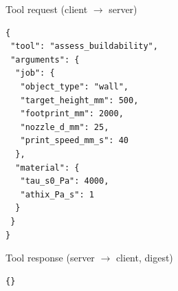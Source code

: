 \begin{mcpbox}{Tool request (client $\rightarrow$ server)}
\begin{lstlisting}[style=jsonstyle]
{
 "tool": "assess_buildability",
 "arguments": {
  "job": {
   "object_type": "wall",
   "target_height_mm": 500,
   "footprint_mm": 2000,
   "nozzle_d_mm": 25,
   "print_speed_mm_s": 40
  },
  "material": {
   "tau_s0_Pa": 4000,
   "athix_Pa_s": 1
  }
 }
}
\end{lstlisting}
\end{mcpbox}
\begin{mcpbox}{Tool response (server $\rightarrow$ client, digest)}
\begin{lstlisting}[style=jsonstyle]
{}
\end{lstlisting}
\end{mcpbox}